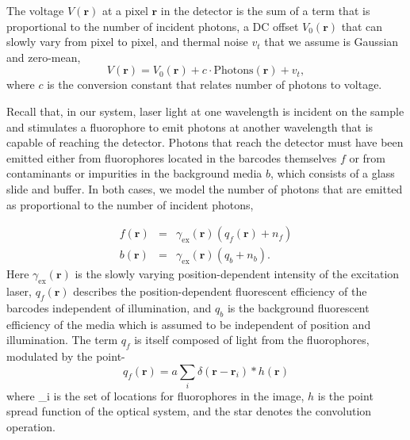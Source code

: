 The voltage $V(\mathbf{r})$ at a pixel $\mathbf{r}$ in the detector is the sum of a term that is proportional to the number of incident photons, a DC offset $V_0(\mathbf{r})$ that can slowly vary from pixel to pixel, and thermal noise $v_t$ that we assume is Gaussian and zero-mean,
\begin{equation}
V(\mathbf{r})=V_0(\mathbf{r})+c \cdot \text{Photons}(\mathbf{r}) +v_t,
\end{equation}
where $c$ is the conversion constant that relates number of photons to voltage. 


Recall that, in our system, laser light at one wavelength is incident on the sample and stimulates a fluorophore to emit photons at another wavelength that is capable of reaching the detector. Photons that reach the detector must have been emitted either from fluorophores located  in the barcodes themselves $f$ or from contaminants or impurities in the background media $b$, which consists of a glass slide and buffer.  In both cases, we model the number of photons that are emitted as proportional to the number of incident photons, 


\begin{eqnarray}
f(\mathbf{r})&=&\gamma_{\text{ex}}(\mathbf{r}) ( q_f(\mathbf{r}) + n_f )\\
b(\mathbf{r})&=&\gamma_{\text{ex}}(\mathbf{r}) ( q_b + n_b ).
\end{eqnarray}
Here $\gamma_{\text{ex}}(\mathbf{r})$ is the slowly varying position-dependent intensity of the excitation laser,  $q_f(\mathbf{r})$ describes the position-dependent fluorescent efficiency of the barcodes independent of illumination, and $q_b$ is the background fluorescent efficiency of the media which is assumed to be independent of position and illumination. The term $q_f$ is itself composed of light from the fluorophores, modulated by the point-
\begin{equation}
q_f(\mathbf{r})=a \sum_i\delta(\mathbf{r}-\mathbf{r}_i) * h(\mathbf{r})
\end{equation}
where _i is the set of locations for fluorophores in the image, $h$ is the point spread function of the optical system, and the star denotes the convolution operation.


